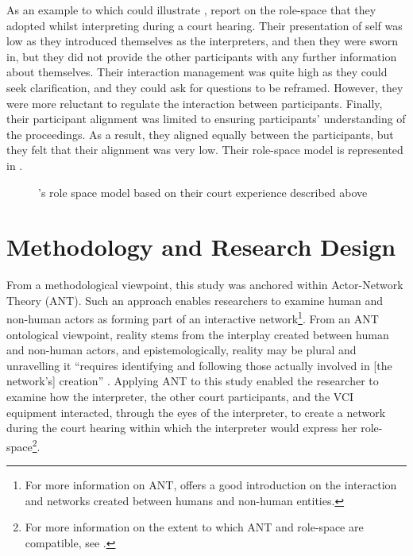 \documentclass[output=paper]{langsci/langscibook}
\begin{document}
As an example to which could illustrate , \citet[77-78]{Llewellyn-Jones2014} report on the role-space that they adopted whilst interpreting during a court hearing. Their presentation of self was low as they introduced themselves as the interpreters, and then they were sworn in, but they did not provide the other participants with any further information about themselves. Their interaction management was quite high as they could seek clarification, and they could ask for questions to be reframed. However, they were more reluctant to regulate the interaction between participants. Finally, their participant alignment was limited to ensuring participants’ understanding of the proceedings. As a result, they aligned equally between the participants, but they felt that their alignment was very low. Their role-space model is represented in . 

  
 

\begin{figure}
\caption{\citet{Llewellyn-Jones2014}’s role space model based on their court experience described above\label{fig:devaux:2}}
\end{figure}

\section{Methodology and Research Design}
\label{sec:devaux:4}
From a methodological viewpoint, this study was anchored within Actor-Network Theory (\textsc{ANT}). Such an approach enables researchers to examine human and non-human actors as forming part of an interactive network\footnote{For more information on \textsc{ANT}, \citet{Latour2005} offers a good introduction on the interaction and networks created between humans and non-human entities.}. From an \textsc{ANT} ontological viewpoint, reality stems from the interplay created between human and non-human actors, and epistemologically, reality may be plural and unravelling it “requires identifying and following those actually involved in [the network’s] creation” \citep[112]{Bonner2013}. Applying \textsc{ANT} to this study enabled the researcher to examine how the interpreter, the other court participants, and the \textsc{VCI} equipment interacted, through the eyes of the interpreter, to create a network during the court hearing within which the interpreter would express her role-space\footnote{For more information on the extent to which \textsc{ANT} and role-space are compatible, see \citet{Devaux2017b}.}. 
\end{document}
